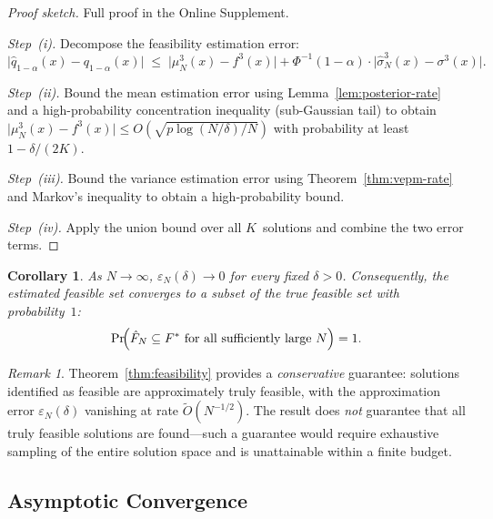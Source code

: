 \documentclass[12pt]{article}
\theoremstyle{plain}
\newtheorem{corollary}{Corollary}[section]
\theoremstyle{definition}
\theoremstyle{remark}
\newtheorem{remark}{Remark}[section]
\begin{document}
\begin{proof}[Proof sketch]
Full proof in the Online Supplement.

\emph{Step~(i).}
Decompose the feasibility estimation error:
\[
  \bigl\lvert\hat{q}_{1-\alpha}(x)-q_{1-\alpha}(x)\bigr\rvert
  \;\le\;
  \bigl\lvert\mu^{3}_{N}(x)-f^{3}(x)\bigr\rvert
  +
  \Phi^{-1}(1-\alpha)\cdot
  \bigl\lvert\hat{\sigma}_{N}^{3}(x)-\sigma^{3}(x)\bigr\rvert.
\]

\emph{Step~(ii).}
Bound the mean estimation error using Lemma~\ref{lem:posterior-rate} and a
high-probability concentration inequality (sub-Gaussian tail) to obtain
$\lvert\mu^{3}_{N}(x)-f^{3}(x)\rvert
  \le O(\sqrt{p\log(N/\delta)/N})$
with probability at least $1-\delta/(2K)$.

\emph{Step~(iii).}
Bound the variance estimation error using Theorem~\ref{thm:vepm-rate} and
Markov's inequality to obtain a high-probability bound.

\emph{Step~(iv).}
Apply the union bound over all $K$~solutions and combine the two error
terms.
\end{proof}

\begin{corollary}\label{cor:feasibility-asymptotic}
As $N\to\infty$, $\varepsilon_{N}(\delta)\to0$ for every fixed
$\delta>0$.  Consequently, the estimated feasible set converges to a
subset of the true feasible set with probability~$1$:
\[
  \Pr\!\Bigl(\hat{F}_{N}\subseteq F^{*}
    \text{ for all sufficiently large } N\Bigr) = 1.
\]
\end{corollary}

\begin{remark}\label{rem:conservative}
Theorem~\ref{thm:feasibility} provides a \emph{conservative} guarantee:
solutions identified as feasible are approximately truly feasible, with
the approximation error $\varepsilon_{N}(\delta)$ vanishing at rate
$\tilde{O}(N^{-1/2})$.  The result does \emph{not} guarantee that all
truly feasible solutions are found---such a guarantee would require
exhaustive sampling of the entire solution space and is unattainable
within a finite budget.
\end{remark}

\subsection{Asymptotic Convergence}\label{sec:asymptotic}
\end{document}
